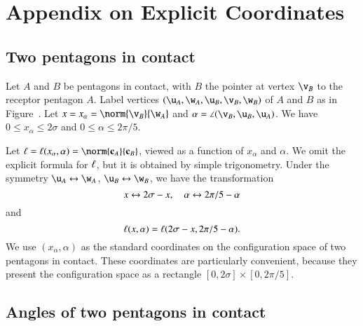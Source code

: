 \section{Appendix on Explicit Coordinates}


\subsection{Two pentagons in contact}

Let $A$ and $B$ be pentagons in contact, with $B$ the pointer at
vertex $\v_B$ to the receptor pentagon $A$.  Label vertices
$(\u_A,\w_A,\u_B,\v_B,\w_B)$ of $A$ and $B$ as in
Figure~.  Let $x=x_\alpha=\norm{\v_B}{\w_A}$ and $\alpha
= \angle(\v_B,\u_B,\u_A)$.  We have $0\le x_\alpha\le 2\sigma$ and
$0\le \alpha\le 2\pi/5$.



Let $\bl = \bl(x_\alpha,\alpha) = \norm{\c_A}{\c_B}$, viewed as a
function of $x_\alpha$ and $\alpha$.  We omit the explicit formula for
$\ell$, but it is obtained by simple trigonometry.  Under the symmetry
$\u_A\leftrightarrow \w_A$, $\u_B\leftrightarrow\w_B$, we have the
transformation
\begin{equation}\libel{eqn:sym}
x\leftrightarrow 2\sigma-x,
\quad \alpha\leftrightarrow 2\pi/5-\alpha
\end{equation}
and
\[
\ell(x,\alpha) = \ell(2\sigma-x,2\pi/5 - \alpha).
\]
We use $(x_\alpha,\alpha)$ as the standard coordinates on the
configuration space of two pentagons in contact.  These coordinates
are particularly convenient, because they present the configuration
space as a rectangle $[0,2\sigma]\times[0,2\pi/5]$.


\subsection{Angles of two pentagons in contact}

